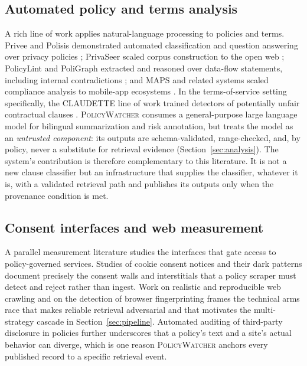 \documentclass[11pt]{article}
\newcommand{\pw}{\textsc{PolicyWatcher}}
\begin{document}
\subsection{Automated policy and terms analysis}
A rich line of work applies natural-language processing to policies and terms.
Privee and Polisis demonstrated automated classification and question answering
over privacy policies \cite{zimmeck2014privee, harkous2018polisis}; PrivaSeer
scaled corpus construction to the open web \cite{srinath2021privacy}; PolicyLint
and PoliGraph extracted and reasoned over data-flow statements, including
internal contradictions \cite{andow2019policylint, cui2023poligraph}; and MAPS
and related systems scaled compliance analysis to mobile-app ecosystems
\cite{zimmeck2019maps}. In the terms-of-service setting specifically, the
CLAUDETTE line of work trained detectors of potentially unfair contractual
clauses \cite{lippi2019claudette}. \pw{} consumes a general-purpose large
language model for bilingual summarization and risk annotation, but treats the
model as an \emph{untrusted component}: its outputs are schema-validated,
range-checked, and, by policy, never a substitute for retrieval evidence
(Section~\ref{sec:analysis}). The system's contribution is therefore
complementary to this literature. It is not a new clause classifier but an
infrastructure that supplies the classifier, whatever it is, with a validated
retrieval path and publishes its outputs only when the provenance condition is
met.

\subsection{Consent interfaces and web measurement}
A parallel measurement literature studies the interfaces that gate access to
policy-governed services. Studies of cookie consent notices and their dark
patterns \cite{utz2019consent, nouwens2020dark, matte2020cookie,
sanchezrola2019optout} document precisely the consent walls and interstitials
that a policy scraper must detect and reject rather than ingest. Work on
realistic and reproducible web crawling \cite{jueckstock2021realistic} and on
the detection of browser fingerprinting \cite{iqbal2021fingerprinting} frames the
technical arms race that makes reliable retrieval adversarial and that motivates
the multi-strategy cascade in Section~\ref{sec:pipeline}. Automated auditing of
third-party disclosure in policies \cite{libert2018auditing} further underscores
that a policy's text and a site's actual behavior can diverge, which is one
reason \pw{} anchors every published record to a specific retrieval event.
\end{document}
